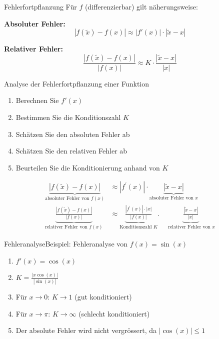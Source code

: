 \begin{theorem}{Fehlerfortpflanzung}
Für $f$ (differenzierbar) gilt näherungsweise:
\vspace{1mm}\\
\begin{minipage}[t]{0.47\textwidth}
    \textbf{Absoluter Fehler:}  
    \vspace{-2mm}\\
    $$|f(\tilde{x})-f(x)| \approx |f'(x)| \cdot |\tilde{x}-x|$$
\end{minipage}
\hspace{3mm}
\begin{minipage}[t]{0.43\textwidth}
    \textbf{Relativer Fehler:}  
    \vspace{-2mm}\\
    $$\frac{|f(\tilde{x})-f(x)|}{|f(x)|} \approx K \cdot \frac{|\tilde{x}-x|}{|x|}$$
\end{minipage}
\end{theorem}

\begin{KR}{Analyse der Fehlerfortpflanzung einer Funktion}
\begin{enumerate}
    \item Berechnen Sie $f'(x)$
    \item Bestimmen Sie die Konditionszahl $K$
    \item Schätzen Sie den absoluten Fehler ab
    \item Schätzen Sie den relativen Fehler ab
    \item Beurteilen Sie die Konditionierung anhand von $K$
\end{enumerate}
\vspace{1mm}
$$
\begin{aligned}
\underbrace{|f(\tilde{x})-f(x)|}_{\text {absoluter Fehler von } f(x)} & \approx\left|f^{\prime}(x)\right| \cdot \underbrace{|\tilde{x}-x|}_{\text {absoluter Fehler von } x} \\
\underbrace{\frac{|f(\tilde{x})-f(x)|}{|f(x)|}}_{\text {relativer Fehler von } f(x)} & \approx \underbrace{\frac{\left|f^{\prime}(x)\right| \cdot|x|}{|f(x)|}}_{\text {Konditionszahl } K} . \quad \underbrace{\frac{|\tilde{x}-x|}{|x|}}_{\text { relativer Fehler von } x }
\end{aligned}
$$
\end{KR}

\raggedcolumns

\begin{example2}{Fehleranalyse}Beispiel: Fehleranalyse von $f(x)=\sin(x)$
\begin{enumerate}
    \item $f'(x) = \cos(x)$
    \item $K = \frac{|x\cos(x)|}{|\sin(x)|}$
    \item Für $x \to 0$: $K \to 1$ (gut konditioniert)
    \item Für $x \to \pi$: $K \to \infty$ (schlecht konditioniert)
    \item Der absolute Fehler wird nicht vergrössert, da $|\cos(x)| \leq 1$
\end{enumerate}
\end{example2}

